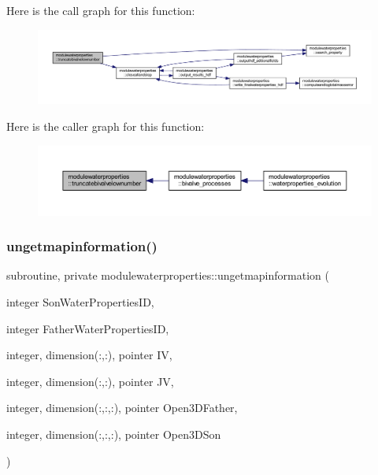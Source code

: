 Here is the call graph for this function\+:\nopagebreak
\begin{figure}[H]
\begin{center}
\leavevmode
\includegraphics[width=350pt]{namespacemodulewaterproperties_ab62d1ee17d0bdd78beb327d8dd8c2f4d_cgraph}
\end{center}
\end{figure}
Here is the caller graph for this function\+:\nopagebreak
\begin{figure}[H]
\begin{center}
\leavevmode
\includegraphics[width=350pt]{namespacemodulewaterproperties_ab62d1ee17d0bdd78beb327d8dd8c2f4d_icgraph}
\end{center}
\end{figure}
\mbox{\label{namespacemodulewaterproperties_ab369effb692dc27866518b2a5fa9fe1b}} 
\subsubsection{\texorpdfstring{ungetmapinformation()}{ungetmapinformation()}}
{\footnotesize\ttfamily subroutine, private modulewaterproperties\+::ungetmapinformation (\begin{DoxyParamCaption}\item[{integer}]{Son\+Water\+Properties\+ID,  }\item[{integer}]{Father\+Water\+Properties\+ID,  }\item[{integer, dimension(\+:,\+:), pointer}]{IV,  }\item[{integer, dimension(\+:,\+:), pointer}]{JV,  }\item[{integer, dimension(\+:,\+:,\+:), pointer}]{Open3\+D\+Father,  }\item[{integer, dimension(\+:,\+:,\+:), pointer}]{Open3\+D\+Son }\end{DoxyParamCaption})\hspace{0.3cm}{\ttfamily [private]}}

